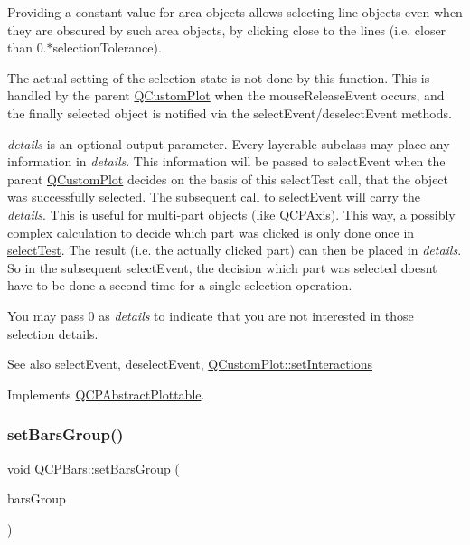 Providing a constant value for area objects allows selecting line objects even when they are obscured by such area objects, by clicking close to the lines (i.\+e. closer than 0.$\ast$selection\+Tolerance).

The actual setting of the selection state is not done by this function. This is handled by the parent \hyperlink{class_q_custom_plot}{Q\+Custom\+Plot} when the mouse\+Release\+Event occurs, and the finally selected object is notified via the select\+Event/deselect\+Event methods.

{\itshape details} is an optional output parameter. Every layerable subclass may place any information in {\itshape details}. This information will be passed to select\+Event when the parent \hyperlink{class_q_custom_plot}{Q\+Custom\+Plot} decides on the basis of this select\+Test call, that the object was successfully selected. The subsequent call to select\+Event will carry the {\itshape details}. This is useful for multi-\/part objects (like \hyperlink{class_q_c_p_axis}{Q\+C\+P\+Axis}). This way, a possibly complex calculation to decide which part was clicked is only done once in \hyperlink{class_q_c_p_bars_a62d66cc8eedca6bedfc1f6513164d418}{select\+Test}. The result (i.\+e. the actually clicked part) can then be placed in {\itshape details}. So in the subsequent select\+Event, the decision which part was selected doesn\textquotesingle{}t have to be done a second time for a single selection operation.

You may pass 0 as {\itshape details} to indicate that you are not interested in those selection details.

\begin{DoxySeeAlso}{See also}
select\+Event, deselect\+Event, \hyperlink{class_q_custom_plot_a5ee1e2f6ae27419deca53e75907c27e5}{Q\+Custom\+Plot\+::set\+Interactions} 
\end{DoxySeeAlso}


Implements \hyperlink{class_q_c_p_abstract_plottable_a38efe9641d972992a3d44204bc80ec1d}{Q\+C\+P\+Abstract\+Plottable}.

\hypertarget{class_q_c_p_bars_aedd1709061f0b307c47ddb45e172ef9a}{}\label{class_q_c_p_bars_aedd1709061f0b307c47ddb45e172ef9a} 
\subsubsection{\texorpdfstring{set\+Bars\+Group()}{setBarsGroup()}}
{\footnotesize\ttfamily void Q\+C\+P\+Bars\+::set\+Bars\+Group (\begin{DoxyParamCaption}\item[{\hyperlink{class_q_c_p_bars_group}{Q\+C\+P\+Bars\+Group} $\ast$}]{bars\+Group }\end{DoxyParamCaption})}

